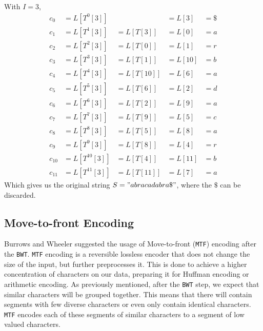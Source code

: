 \documentclass{article}
\begin{document}
With \(I=3\), 
\begin{align*}
    c_0 &= L[T^{0}[3]] & &= L[3] &= \$ \\
    c_1 &= L[T^{1}[3]] &= L[T[3]] &= L[0] &= a \\
    c_2 &= L[T^{2}[3]] &= L[T[0]] &= L[1] &= r \\
    c_3 &= L[T^{3}[3]] &= L[T[1]] &= L[10] &= b \\
    c_4 &= L[T^{4}[3]] &= L[T[10]] &= L[6] &= a \\
    c_5 &= L[T^{5}[3]] &= L[T[6]] &= L[2] &= d \\
    c_6 &= L[T^{6}[3]] &= L[T[2]] &= L[9] &= a \\
    c_7 &= L[T^{7}[3]] &= L[T[9]] &= L[5] &= c \\
    c_8 &= L[T^{8}[3]] &= L[T[5]] &= L[8] &= a \\
    c_9 &= L[T^{9}[3]] &= L[T[8]] &= L[4] &= r \\
    c_{10} &= L[T^{10}[3]] &= L[T[4]] &= L[11] &= b \\
    c_{11} &= L[T^{11}[3]] &= L[T[11]] &= L[7] &= a
\end{align*}
Which gives us the original string \(S="abracadabra\$"\), where the \(\$\) can be discarded.

\subsection{Move-to-front Encoding}\label{sectionMTF}

Burrows and Wheeler suggested the usage of Move-to-front (\texttt{MTF}) encoding after the \texttt{BWT}. \texttt{MTF} encoding is a reversible lossless encoder that does not change the size of the input, but further preprocesses it.
This is done to achieve a higher concentration of characters on our data, preparing it for Huffman encoding or arithmetic encoding. As previously mentioned, after the \texttt{BWT} step, we expect that similar characters will be grouped together. This means that there will contain segments with few diverse characters or even only contain identical characters. \texttt{MTF} encodes each of these segments of similar characters to a segment of low valued characters.
\end{document}
